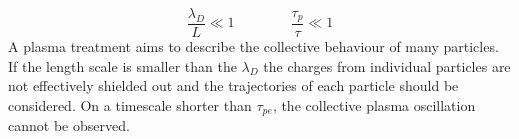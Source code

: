         \[\frac{\lambda_D}{L} \ll 1  \qquad{} \qquad \frac{\tau_p}{\tau} \ll 1 \]
		A plasma treatment aims to describe the collective behaviour of many particles.
		If the length scale is smaller than the \(\lambda_D\) the charges from
		individual particles are not effectively shielded out and the trajectories of each particle should
		be considered. On a timescale shorter than \(\tau_{pe}\), the collective plasma oscillation cannot be observed.

















